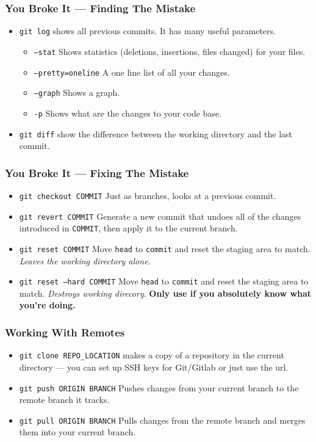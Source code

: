 \documentclass{beamer}
\newcommand{\shellcmd}[1]{\texttt{\colorbox{gray!30}{#1}}}
\newcommand{\hugeslide}[1]{
\begin{frame}[plain,c]
    \centering {\usebeamerfont*{frametitle} \usebeamercolor[fg]{frametitle}\fontsize{40}{50}\selectfont \textit{#1}}
\end{frame}
}
\begin{document}
\hugeslide{Demo}

\begin{frame}
    \frametitle{You Broke It --- Finding The Mistake}

    \begin{itemize}
        \item \shellcmd{git log} shows all previous commits. It has many useful parameters.
        \begin{itemize}
            \item \shellcmd{--stat} Shows statistics (deletions, insertions, files changed) for your files.
            \item \shellcmd{--pretty=oneline} A one line list of all your changes.
            \item \shellcmd{--graph} Shows a graph.
            \item \shellcmd{-p} Shows what are the changes to your code base.
        \end{itemize}

        \item \shellcmd{git diff} show the difference between the working directory and the last commit.
    \end{itemize}
\end{frame}

\begin{frame}
    \frametitle{You Broke It --- Fixing The Mistake}

    \begin{itemize}
        \item \shellcmd{git checkout COMMIT} Just as branches, looks at a previous commit.
        \item \shellcmd{git revert COMMIT} Generate a new commit that undoes all of the changes introduced in \shellcmd{COMMIT}, then apply it to the current branch.
        \item \shellcmd{git reset COMMIT} Move \shellcmd{head} to \shellcmd{commit} and reset the staging area to match. \textit{Leaves the working directory alone}.
        \item  \shellcmd{git reset --hard COMMIT} Move \shellcmd{head} to \shellcmd{commit} and reset the staging area to match. \textit{Destroys working direcory}. \textbf{Only use if you absolutely know what you're doing.}
    \end{itemize}
\end{frame}

\begin{frame}
    \frametitle{Working With Remotes}

    \begin{itemize}
		\item \shellcmd{git clone REPO\_LOCATION} makes a copy of a repository in the current directory --- you can set up SSH keys for Git/Gitlab or just use the url.
		\item \shellcmd{git push ORIGIN BRANCH} Pushes changes from your current branch to the remote branch it tracks.
		\item \shellcmd{git pull ORIGIN BRANCH} Pulls changes from the remote branch and merges them into your current branch.
	\end{itemize}
\end{frame}
\end{document}
